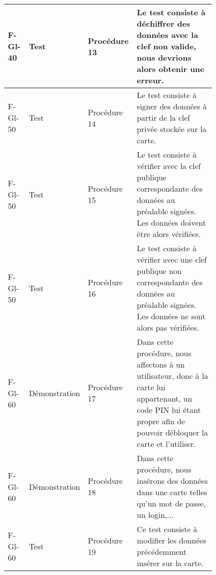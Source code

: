 \documentclass[a4paper,11pt,french]{article}
\begin{document}
\begin{figure}[!h]
\begin{tabular}{|p{2cm}|p{2.5cm}|p{2cm}|p{9cm}|}
\hline
F-Gl-40 & Test & Procédure 13 & Le test consiste à déchiffrer des données avec la clef non valide, nous devrions alors obtenir une erreur. \\
\hline
F-Gl-50 & Test & Procédure 14 & Le test consiste à signer des données à partir de la clef privée stockée sur la carte. \\
\hline
F-Gl-50 & Test & Procédure 15 & Le test consiste à vérifier avec la clef publique correspondante des données au préalable signées. Les données doivent être alors vérifiées. \\
\hline
F-Gl-50 & Test & Procédure 16 & Le test consiste à vérifier avec une clef publique non correspondante des données au préalable signées. Les données ne sont alors pas vérifiées. \\
\hline
F-Gl-60 & Démonstration & Procédure 17 & Dans cette procédure, nous affectons à un utilisateur, donc à la carte lui appartenant, un code PIN lui étant propre afin de pouvoir débloquer la carte et l'utiliser. \\
\hline
F-Gl-60 & Démonstration & Procédure 18 & Dans cette procédure, nous insérons des données dans une carte telles qu'un mot de passe, un login,... \\
\hline
F-Gl-60 & Test & Procédure 19 & Ce test consiste à modifier les données précédemment insérer sur la carte. \\
\hline
\end{tabular}
\end{figure}
\end{document}
